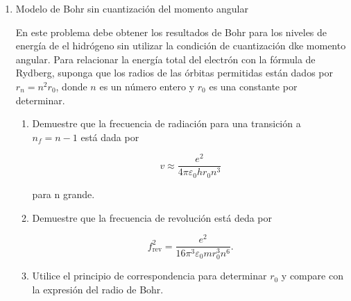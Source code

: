 \documentclass[12pt,a4paper]{article}
\begin{document}
\begin{enumerate}
\begin{enumerate}

\item Calcule la energía cinética del retroceso del átomo.

\item ¿Qué fracción de la energía de excitación del estado $n = 2$ es transportada por el átomo debido a su retroceso?

\end{enumerate}

\item Modelo de Bohr sin cuantización del momento angular

En este problema debe obtener los resultados de Bohr para los niveles de energía de el hidrógeno sin utilizar la condición de cuantización dke momento angular. Para relacionar la energía total del electrón con la fórmula de Rydberg, suponga que los radios de las órbitas permitidas están dados por $r_n = n^2 r_0$, donde $n$ es un número entero y $r_0$ es una constante por determinar.

\begin{enumerate}

\item Demuestre que la frecuencia de radiación para una transición a $n_f = n - 1$ está dada por

$$ v \approx \frac{e^2}{4\pi\varepsilon_0 h r_0 n^3}$$

para n grande.

\item Demuestre que la frecuencia de revolución está deda por

$$ f^2_\mathrm{rev} = \frac{e^2}{16 \pi^3 \varepsilon_0 m r^3_0 n^6}.$$

\item Utilice el principio de correspondencia para determinar $r_0$ y compare con la expresión del radio de Bohr.

\end{enumerate}

\end{enumerate}
\end{document}
